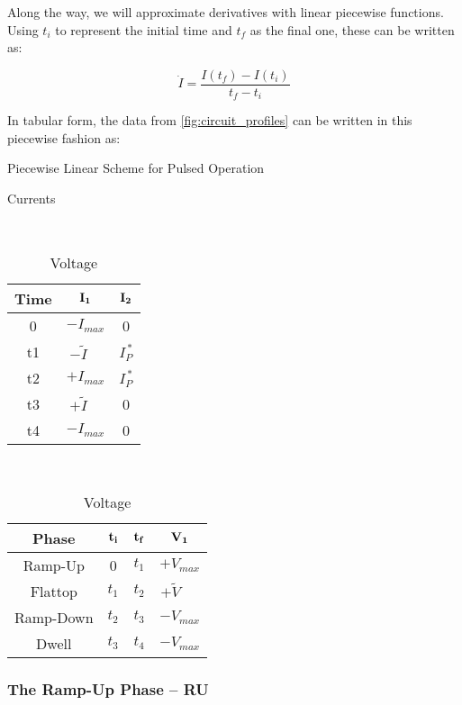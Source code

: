 Along the way, we will approximate derivatives with linear piecewise functions. Using $t_i$ to represent the initial time and $t_f$ as the final one, these can be written as:

\begin{equation}
	\dot I = \frac{ I(t_f) - I(t_i) }{t_f - t_i}
\end{equation}

In tabular form, the data from \cref{fig:circuit_profiles} can be written in this piecewise fashion as:

\begin{table}[h!]
\centering	
\caption{Piecewise Linear Scheme for Pulsed Operation}
\hfill
\begin{subtable}[t]{0.4\textwidth}
\centering	
\caption{Currents} ~\\
\begin{tabular}{ c|c|c } 

\textbf{Time} & {$\bold{I_1}$} & {$\bold{I_2}$} \\
\hline
0 & $-I_{max}$ & 0 \\ 
t1 & $-\tilde I \ \ \ \,\, $ & $I_P^{\,*} $ \\ 
t2 & $+I_{max}$ & $I_P^{\,*}$ \\ 
t3 & $+\tilde I \ \ \ \,\, $ & 0 \\ 
t4 & $-I_{max}$ & 0 \\ 
\end{tabular}
\end{subtable}
\hfill
\begin{subtable}[t]{0.5\textwidth}
\centering	
\caption{Voltage} ~\\
\begin{tabular}{ c|c|c|c } 
\textbf{Phase} & $\bold{t_i}$ & $\bold{t_f}$ & $\bold{V_1}$ \\
\hline
Ramp-Up & 0 & $t_1$ & $+V_{max}$ \\ 
Flattop & $t_1$ & $t_2$ & $+ \tilde V$ \ \,\,\, \\ 
Ramp-Down & $t_2$ & $t_3$ & ${-V}_{max}$ \\ 
Dwell & $t_3$ & $t_4$ & ${-V}_{max}$ \\ 
\end{tabular}
\end{subtable}
\hfill
\hfill
\end{table}

\subsubsection{The Ramp-Up Phase -- RU}

